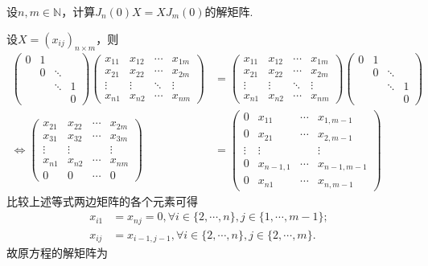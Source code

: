 \documentclass[../../main.tex]{subfiles}
\begin{document}
\begin{proposition}\label{proposition:与J_n(0)可交换的的矩阵}
设$n,m\in\mathbb{N}$，计算$J_n(0)X = XJ_m(0)$的解矩阵. 
\end{proposition}
\begin{solution}
设$X=(x_{ij})_{n\times m}$，则
\begin{align*}
\begin{pmatrix}
0 & 1 &  &  \\
 & 0 & \ddots &  \\
 &  & \ddots & 1 \\
 &  &  & 0
\end{pmatrix}
\begin{pmatrix}
x_{11} & x_{12} & \cdots & x_{1m} \\
x_{21} & x_{22} & \cdots & x_{2m} \\
\vdots & \vdots & \ddots & \vdots \\
x_{n1} & x_{n2} & \cdots & x_{nm}
\end{pmatrix}
&=
\begin{pmatrix}
x_{11} & x_{12} & \cdots & x_{1m} \\
x_{21} & x_{22} & \cdots & x_{2m} \\
\vdots & \vdots & \ddots & \vdots \\
x_{n1} & x_{n2} & \cdots & x_{nm}
\end{pmatrix}
\begin{pmatrix}
0 & 1 &  &  \\
 & 0 & \ddots &  \\
 &  & \ddots & 1 \\
 &  &  & 0
\end{pmatrix} \\
\Longleftrightarrow
\begin{pmatrix}
x_{21} & x_{22} & \cdots & x_{2m} \\
x_{31} & x_{32} & \cdots & x_{3m} \\
\vdots & \vdots &  & \vdots \\
x_{n1} & x_{n2} & \cdots & x_{nm} \\
0 & 0 & \cdots & 0
\end{pmatrix}
&=
\begin{pmatrix}
0 & x_{11} & \cdots & x_{1,m - 1} \\
0 & x_{21} & \cdots & x_{2,m - 1} \\
\vdots & \vdots &  & \vdots \\
0 & x_{n - 1,1} & \cdots & x_{n - 1,m - 1} \\
0 & x_{n1} & \cdots & x_{n,m - 1}
\end{pmatrix}
\end{align*}
比较上述等式两边矩阵的各个元素可得
\begin{align*}
x_{i1}&=x_{nj}=0, \forall i\in\{2,\cdots,n\}, j\in\{1,\cdots,m - 1\}; \\
x_{ij}&=x_{i - 1,j - 1}, \forall i\in\{2,\cdots,n\}, j\in\{2,\cdots,m\}.
\end{align*}
故原方程的解矩阵为


\end{solution}
\end{document}
